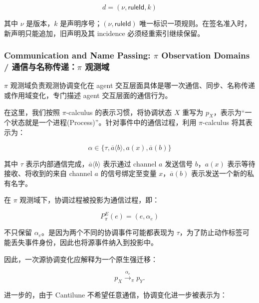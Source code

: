   \begin{equation}
    \boxed{
    d=(\nu,\mathsf{ruleId},k)}
    \label{eq:petri-ordered-rule-declaration}
  \end{equation}

  其中 $\nu$ 是版本，$k$ 是声明序号；$(\nu,\mathsf{ruleId})$ 唯一标识一项规则。在签名准入时，新声明只能追加，旧声明及其 incidence 必须经重索引继续保留。

  \subsubsection{Communication and Name Passing: $\pi$ Observation Domains / 通信与名称传递：$\pi$ 观测域}

  $\pi$ 观测域负责观测协调变化在 agent 交互层面具体是哪一次通信、同步、名称传递或作用域变化，专门描述 agent 交互层面的通信行为。

  在这里，我们按照 $\pi$-calculus 的表示习惯，将协调状态 $X$ 重写为 $p_{X}$，表示为“一个状态就是一个进程(Process)”。针对事件中的通信过程，利用 $\pi$-calculus 将其表示为：

  \begin{equation}
    \boxed{
      \alpha\in
      \{
        \tau,
        \overline a\langle b\rangle,
        a(x),
        \overline a(b)
    \}}
    \label{eq:pi-action-alphabet}
  \end{equation}

  其中 $\tau$ 表示内部通信完成，$\overline a\langle b\rangle$ 表示通过 channel $a$ 发送信号 $b$，$a(x)$ 表示等待接收、将收到的来自 channel $a$ 的信号绑定至变量 $x$，$\overline a(b)$ 表示发送一个新的私有名字。

  在 $\pi$ 观测域下，协调过程被投影为通信过程，即：

  \begin{equation}
    \boxed{
    P_\pi^E(e)=(e,\alpha_e)}
    \label{eq:pi-event-projection}
  \end{equation}

  不只保留 $\alpha_e$。是因为两个不同的协调事件可能都表现为 $\tau$，为了防止动作标签可能丢失事件身份，因此也将源事件纳入到投影中。

  因此，一次源协调变化应解释为一个原生强迁移：

  \begin{equation}
    \boxed{
      p_X\xrightarrow{\alpha_e}_{\pi}p_Y.
    }
    \label{eq:pi-native-strong-transition}
  \end{equation}

  进一步的，由于 Cantilune 不希望任意通信，协调变化进一步被表示为：

